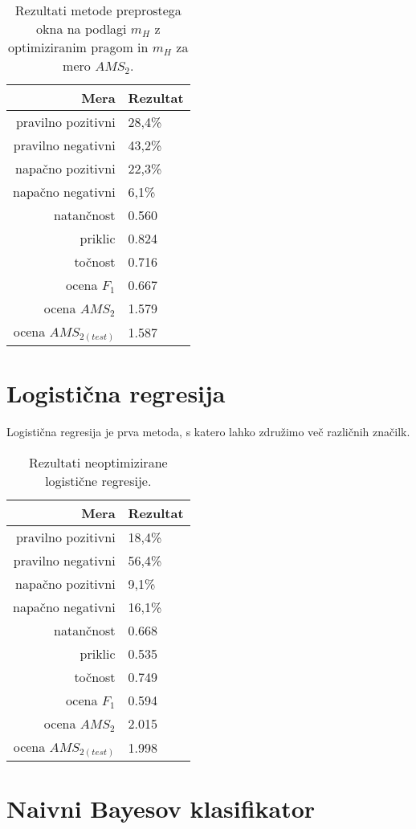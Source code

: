 \documentclass[11pt,a4paper,openany]{book}
\begin{document}
\begin{table}[ht]
	\centering
	\begin{tabular}{rl}
		\hline
		\textbf{Mera} & \textbf{Rezultat} \\
		\hline
		pravilno pozitivni & 28,4\%\\
		pravilno negativni & 43,2\% \\
		napačno pozitivni & 22,3\% \\
		napačno negativni & 6,1\% \\
		natančnost & 0.560 \\
		priklic & 0.824 \\
		točnost & 0.716 \\
		ocena $F_1$ & 0.667 \\
		ocena $AMS_2$ & 1.579 \\
		ocena $AMS_{2(test)}$ & 1.587 		
	\end{tabular}
	\caption{Rezultati metode preprostega okna na podlagi $m_H$ z optimiziranim pragom in $m_H$ za mero $AMS_2$.}
	\label{tb:preprosto_okno_2d_optimized}
\end{table}

\section{Logistična regresija}
Logistična regresija je prva metoda, s katero lahko združimo več različnih značilk.

\begin{table}[ht]
	\centering
	\begin{tabular}{rl}
		\hline
		\textbf{Mera} & \textbf{Rezultat} \\
		\hline
		pravilno pozitivni & 18,4\%\\
		pravilno negativni & 56,4\% \\
		napačno pozitivni & 9,1\% \\
		napačno negativni & 16,1\% \\
		natančnost & 0.668 \\
		priklic & 0.535 \\
		točnost & 0.749 \\
		ocena $F_1$ & 0.594 \\
		ocena $AMS_2$ & 2.015 \\
		ocena $AMS_{2(test)}$ & 1.998 		
	\end{tabular}
	\caption{Rezultati neoptimizirane logistične regresije.}
	\label{tb:logisticna}
\end{table}


\section{Naivni Bayesov klasifikator}
\end{document}
